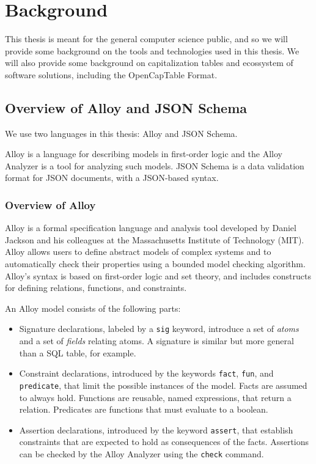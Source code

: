 \chapter{Background}

This thesis is meant for the general computer science public, and so we will provide some background on the tools and technologies used in this thesis. We will also provide some background on capitalization tables and ecossystem of software solutions, including the OpenCapTable Format.

\section{Overview of Alloy and JSON Schema}

We use two languages in this thesis: Alloy and JSON Schema.

Alloy is a language for describing models in first-order logic and the Alloy Analyzer is a tool for analyzing such models. JSON Schema is a data validation format for JSON documents, with a JSON-based syntax.

\subsection{Overview of Alloy}

Alloy\cite{DJSALLA} is a formal specification language and analysis tool developed by Daniel Jackson and his colleagues at the Massachusetts Institute of Technology (MIT). Alloy allows users to define abstract models of complex systems and to automatically check their properties using a bounded model checking algorithm. Alloy's syntax is based on first-order logic and set theory, and includes constructs for defining relations, functions, and constraints.

\noindent An Alloy model consists of the following parts:

\begin{itemize}
	\item Signature declarations, labeled by a \verb|sig| keyword, introduce a set of \textit{atoms} and a set of \textit{fields} relating atoms. A signature is similar but more general than a SQL table, for example.
	\item Constraint declarations, introduced by the keywords \verb|fact|, \verb|fun|, and \verb|predicate|, that limit the possible instances of the model. Facts are assumed to always hold.  Functions are reusable, named expressions, that return a relation. Predicates are functions that must evaluate to a boolean.
	\item Assertion declarations, introduced by the keyword \verb|assert|, that establish constraints that are expected to hold as consequences of the facts. Assertions can be checked by the Alloy Analyzer using the \verb|check| command.
\end{itemize}

